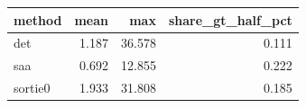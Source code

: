 \begin{tabular}{lrrr}
\toprule
method & mean & max & share_gt_half_pct \\
\midrule
det & 1.187 & 36.578 & 0.111 \\
saa & 0.692 & 12.855 & 0.222 \\
sortie0 & 1.933 & 31.808 & 0.185 \\
\bottomrule
\end{tabular}
